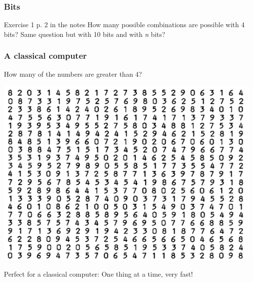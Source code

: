 \documentclass[10pt]{beamer}
\begin{document}
\begin{frame}
  \frametitle{Bits}
  \begin{block}{Exercise 1 p. 2 in the notes}
    How many possible combinations are possible with 4 bits? Same question but with 10 bits and with \emph{n} bits?
  \end{block}
\end{frame}

\begin{frame}
  \frametitle{A classical computer}
  \Large How many of the numbers are greater than 4?

  \centering 
  \includegraphics[scale=0.4]{img/random_numbers.png}

   \normalsize Perfect for a classical computer: One thing at a time, very fast!
  
\end{frame}
\end{document}

